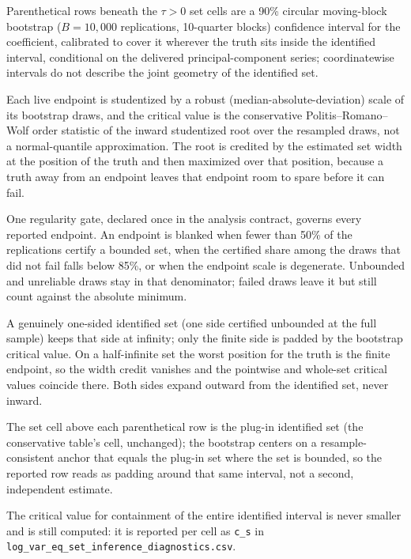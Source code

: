 \documentclass[11pt]{article}
\begin{document}
\begin{table}[!htbp]
\begin{threeparttable}
\begin{tablenotes}[flushleft]
\item Parenthetical rows beneath the $\tau{>}0$ set cells are a 90\% circular moving-block bootstrap ($B=10{,}000$ replications, 10-quarter blocks) confidence interval for the coefficient, calibrated to cover it wherever the truth sits inside the identified interval, conditional on the delivered principal-component series; coordinatewise intervals do not describe the joint geometry of the identified set.
\item Each live endpoint is studentized by a robust (median-absolute-deviation) scale of its bootstrap draws, and the critical value is the conservative Politis--Romano--Wolf order statistic of the inward studentized root over the resampled draws, not a normal-quantile approximation. The root is credited by the estimated set width at the position of the truth and then maximized over that position, because a truth away from an endpoint leaves that endpoint room to spare before it can fail.
\item One regularity gate, declared once in the analysis contract, governs every reported endpoint. An endpoint is blanked when fewer than 50\% of the replications certify a bounded set, when the certified share among the draws that did not fail falls below 85\%, or when the endpoint scale is degenerate. Unbounded and unreliable draws stay in that denominator; failed draws leave it but still count against the absolute minimum.
\item A genuinely one-sided identified set (one side certified unbounded at the full sample) keeps that side at infinity; only the finite side is padded by the bootstrap critical value. On a half-infinite set the worst position for the truth is the finite endpoint, so the width credit vanishes and the pointwise and whole-set critical values coincide there. Both sides expand outward from the identified set, never inward.
\item The set cell above each parenthetical row is the plug-in identified set (the conservative table's cell, unchanged); the bootstrap centers on a resample-consistent anchor that equals the plug-in set where the set is bounded, so the reported row reads as padding around that same interval, not a second, independent estimate.
\item The critical value for containment of the entire identified interval is never smaller and is still computed: it is reported per cell as \texttt{c\_s} in \texttt{log\_var\_eq\_set\_inference\_diagnostics.csv}.
\end{tablenotes}
\end{threeparttable}
\end{table}
\end{document}
